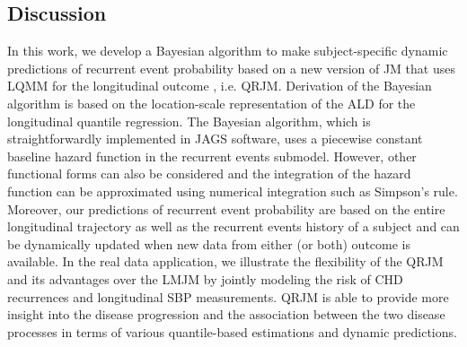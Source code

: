 








% 



\subsection{Discussion}\label{sec:p3discussion}
In this work, we develop a Bayesian algorithm to make subject-specific dynamic predictions of recurrent event probability based on a new version of JM that uses LQMM for the longitudinal outcome , i.e. QRJM. Derivation of the Bayesian algorithm is based on the location-scale representation of the ALD for the longitudinal quantile regression. The Bayesian algorithm, which is straightforwardly implemented in \textsf{JAGS} software, uses a piecewise constant baseline hazard function in the recurrent events submodel. However, other functional forms can also be considered and the integration of the hazard function can be approximated using numerical integration such as Simpson's rule. Moreover, our predictions of recurrent event probability are based on the entire longitudinal trajectory as well as the recurrent events history of a subject and can be dynamically updated when new data from either (or both) outcome is available. In the real data application, we illustrate the flexibility of the QRJM and its advantages over the LMJM by jointly modeling the risk of CHD recurrences and longitudinal SBP measurements. QRJM is able to provide more insight into the disease progression and the association between the two disease processes in terms of various quantile-based estimations and dynamic predictions.

